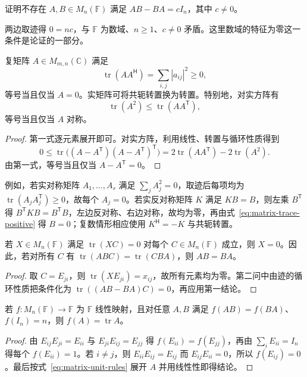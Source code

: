 \begin{example}
证明不存在 $A,B\in M_n(\mathbb F)$ 满足 $AB-BA=cI_n$，其中 $c\ne0$。
\end{example}
\begin{solve}
两边取迹得 $0=nc$，与 $\mathbb F$ 为数域、$n\ge1$、$c\ne0$ 矛盾。这里数域的特征为零这一条件是论证的一部分。
\end{solve}

\begin{proposition}
\label{prop:matrix-trace-positive}
复矩阵 $A\in M_{m,n}(\mathbb C)$ 满足
\begin{equation}
 \operatorname{tr}(AA^{\mathsf H})=\sum_{i,j}|a_{ij}|^2\ge0,
 \label{eq:matrix-trace-positive}
\end{equation}
等号当且仅当 $A=0$。实矩阵可将共轭转置换为转置。特别地，对实方阵有
\begin{equation}
 \operatorname{tr}(A^2)\le\operatorname{tr}(AA^{\mathsf T}),
 \label{eq:matrix-trace-square-bound}
\end{equation}
等号当且仅当 $A$ 对称。
\end{proposition}
\begin{proof}
第一式逐元素展开即可。对实方阵，利用线性、转置与循环性质得到
\[
 0\le\operatorname{tr}\bigl((A-A^{\mathsf T})(A-A^{\mathsf T})^{\mathsf T}\bigr)
 =2\operatorname{tr}(AA^{\mathsf T})-2\operatorname{tr}(A^2).
\]
由第一式，等号当且仅当 $A-A^{\mathsf T}=0$。
\end{proof}

例如，若实对称矩阵 $A_1,\ldots,A_s$ 满足 $\sum_jA_j^2=0$，取迹后每项均为 $\operatorname{tr}(A_jA_j^{\mathsf T})\ge0$，故每个 $A_j=0$。若实反对称矩阵 $K$ 满足 $KB=B$，则左乘 $B^{\mathsf T}$ 得 $B^{\mathsf T}KB=B^{\mathsf T}B$，左边反对称、右边对称，故均为零，再由式~\eqref{eq:matrix-trace-positive} 得 $B=0$；复数情形相应使用 $K^{\mathsf H}=-K$ 与共轭转置。

\begin{proposition}
\label{prop:matrix-trace-pairing}
若 $X\in M_n(\mathbb F)$ 满足 $\operatorname{tr}(XC)=0$ 对每个 $C\in M_n(\mathbb F)$ 成立，则 $X=0$。因此，若对所有 $C$ 有 $\operatorname{tr}(ABC)=\operatorname{tr}(CBA)$，则 $AB=BA$。
\end{proposition}
\begin{proof}
取 $C=E_{ji}$，则 $\operatorname{tr}(XE_{ji})=x_{ij}$，故所有元素均为零。第二问中由迹的循环性质把条件化为 $\operatorname{tr}((AB-BA)C)=0$，再应用第一结论。
\end{proof}

\begin{proposition}
\label{prop:matrix-trace-characterization}
若 $f:M_n(\mathbb F)\to\mathbb F$ 为 $\mathbb F$ 线性映射，且对任意 $A,B$ 满足 $f(AB)=f(BA)$、$f(I_n)=n$，则 $f(A)=\operatorname{tr}A$。
\end{proposition}
\begin{proof}
由 $E_{ij}E_{ji}=E_{ii}$ 与 $E_{ji}E_{ij}=E_{jj}$ 得 $f(E_{ii})=f(E_{jj})$，再由 $\sum_iE_{ii}=I_n$ 得每个 $f(E_{ii})=1$。若 $i\ne j$，则 $E_{ii}E_{ij}=E_{ij}$ 而 $E_{ij}E_{ii}=0$，所以 $f(E_{ij})=0$。最后按式~\eqref{eq:matrix-unit-rules} 展开 $A$ 并用线性性即得结论。
\end{proof}

